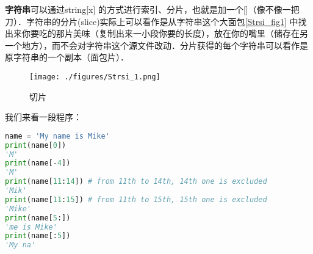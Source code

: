 

\textbf{字符串}可以通过string[x] 的方式进行索引、分片，也就是加一个[]（像不像一把刀）．字符串的分片(slice)实际上可以看作是从字符串这个大面包\autoref{Strsi_fig1} 中找出来你要吃的那片美味（复制出来一小段你要的长度），放在你的嘴里（储存在另一个地方），而不会对字符串这个源文件改动．分片获得的每个字符串可以看作是原字符串的一个副本（面包片）．

\begin{figure}[ht]
\centering
\texttt{[image: ./figures/Strsi\_1.png]}
\caption{切片} \label{Strsi_fig1}
\end{figure}

我们来看一段程序：
\begin{lstlisting}[language=python]
name = 'My name is Mike'
print(name[0])
'M'
print(name[-4])
'M'
print(name[11:14]) # from 11th to 14th, 14th one is excluded
'Mik'
print(name[11:15]) # from 11th to 15th, 15th one is excluded
'Mike'
print(name[5:]) 
'me is Mike'
print(name[:5]) 
'My na'
\end{lstlisting}